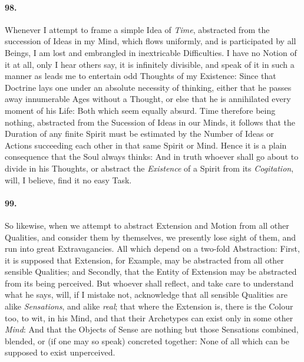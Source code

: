\documentclass[]{article}
\newenvironment{sectionbody}{}{}
\begin{document}
\begin{sectionbody}
\paragraph{98.} Whenever I attempt to frame a simple Idea of \emph{Time},
abstracted from the succession of Ideas in my Mind, which flows
uniformly, and is participated by all Beings, I am lost and
embrangled in inextricable Difficulties.  I have no Notion of it
at all, only I hear others say, it is infinitely divisible, and
speak of it in such a manner as leads me to entertain odd
Thoughts of my Existence: Since that Doctrine lays one under an
absolute necessity of thinking, either that he passes away
innumerable Ages without a Thought, or else that he is
annihilated every moment of his Life: Both which seem equally
absurd.  Time therefore being nothing, abstracted from the
Sucession of Ideas in our Minds, it follows that the Duration of
any finite Spirit must be estimated by the Number of Ideas or
Actions succeeding each other in that same Spirit or Mind.  Hence
it is a plain consequence that the Soul always thinks: And in
truth whoever shall go about to divide in his Thoughts, or
abstract the \emph{Existence} of a Spirit from its
\emph{Cogitation}, will, I believe, find it no easy Task.



\paragraph{99.} So likewise, when we attempt to abstract Extension and Motion
from all other Qualities, and consider them by themselves, we
presently lose sight of them, and run into great Extravagancies.
All which depend on a two-fold Abstraction: First, it is supposed
that Extension, for Example, may be abstracted from all other
sensible Qualities; and Secondly, that the Entity of Extension
may be abstracted from its being perceived.  But whoever shall
reflect, and take care to understand what he says, will, if I
mistake not, acknowledge that all sensible Qualities are alike
\emph{Sensations}, and alike \emph{real}; that where the
Extension is, there is the Colour too, to wit, in his Mind, and
that their Archetypes can exist only in some other \emph{Mind}:
And that the Objects of Sense are nothing but those Sensations
combined, blended, or (if one may so speak) concreted together:
None of all which can be supposed to exist unperceived.




\end{sectionbody}
\end{document}
